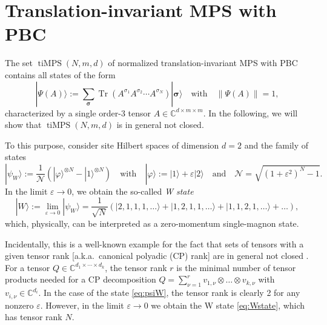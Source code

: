 \documentclass[english,11pt,aps,pra,onecolumn,tightenlines,groupedaddress,superscriptaddress,notitlepage,floatfix,fleqn]{revtex4-1}
\newcommand{\ket}{\rangle}
\newcommand{\Tr}{\operatorname{Tr}}
\renewcommand{\vec}[1]{{\boldsymbol{#1}}}
\newcommand{\s}{\sigma}
\newcommand{\vs}{\vec{\sigma}}
\newcommand{\CC}{\mathbb{C}}
\newcommand{\mc}[1]{\mathcal{#1}}
\newcommand{\tiMPS}{\operatorname{tiMPS}}
\newcommand{\veps}{\varepsilon}
\newcommand{\vphi}{\varphi}
\begin{document}
\section{Translation-invariant MPS with PBC}\label{sec:tiMPS}
The set $\tiMPS(N,m,d)$ of normalized translation-invariant MPS with PBC contains all states of the form
\begin{equation}\label{eq:tiMPS}
	|\Psi(A)\ket:=\sum_\vs \Tr( A^{\s_1}A^{\s_2}\dotsb A^{\s_N})|\vs\ket\quad\text{with}\quad
	\|\Psi(A)\|=1,
\end{equation}
characterized by a single order-3 tensor $A\in \CC^{d\times m\times m}$. In the following, we will show that $\tiMPS(N,m,d)$ is in general not closed.

To this purpose, consider site Hilbert spaces of dimension $d=2$ and the family of states
\begin{equation}\label{eq:psiW}
	|\psi_W\ket:=\frac{1}{\mc{N}}(|\vphi\ket^{\otimes N}-|1\ket^{\otimes N})
	\quad\text{with}\quad |\vphi\ket:=|1\ket+\veps|2\ket\quad\text{and}\quad
	\mc{N}=\sqrt{(1+\veps^2)^N-1}.
\end{equation}
In the limit $\veps\to 0$, we obtain the so-called \emph{W state} \cite{Duer2000-62}
\begin{equation}\label{eq:Wstate}
	|W\ket:=\lim_{\veps\to 0}|\psi_W\ket=\frac{1}{\sqrt{N}}\left(|2,1,1,1,\dotsc\ket+|1,2,1,1,\dotsc\ket+|1,1,2,1,\dotsc\ket+\dotsc\right),
\end{equation}
which, physically, can be interpreted as a zero-momentum single-magnon state.

Incidentally, this is a well-known example for the fact that sets of tensors with a given tensor rank [a.k.a.\ canonical polyadic (CP) rank] are in general not closed \cite{Bini1979-8,deSilva2008-30}. For a tensor $Q\in\CC^{d_1\times\dotsb\times d_k}$, the tensor rank $r$ is the minimal number of tensor products needed for a CP decomposition $Q=\sum_{\nu=1}^r v_{1,\nu}\otimes\dots\otimes v_{k,\nu}$ with $v_{i,\nu}\in\CC^{d_i}$. In the case of the state \eqref{eq:psiW}, the tensor rank is clearly 2 for any nonzero $\veps$. However, in the limit $\veps\to 0$ we obtain the W state \eqref{eq:Wstate}, which has tensor rank $N$.
\end{document}

